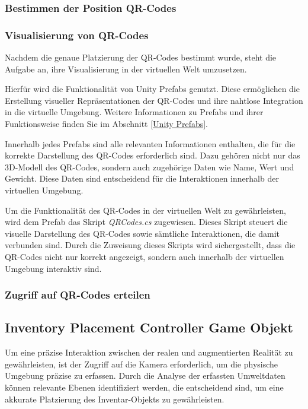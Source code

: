 \subsubsection{Bestimmen der Position QR-Codes}

\subsubsection{Visualisierung von QR-Codes}
Nachdem die genaue Platzierung der QR-Codes bestimmt wurde, steht die Aufgabe an, ihre Visualisierung in der virtuellen Welt umzusetzen.

Hierfür wird die Funktionalität von Unity Prefabs genutzt. Diese ermöglichen die Erstellung visueller Repräsentationen
der QR-Codes und ihre nahtlose Integration in die virtuelle Umgebung. Weitere Informationen zu Prefabs und ihrer Funktionsweise
finden Sie im Abschnitt \ref{Unity Prefabs}.

Innerhalb jedes Prefabs sind alle relevanten Informationen enthalten, die für die korrekte Darstellung des QR-Codes
erforderlich sind. Dazu gehören nicht nur das 3D-Modell des QR-Codes, sondern auch zugehörige Daten wie Name, Wert und
Gewicht. Diese Daten sind entscheidend für die Interaktionen innerhalb der virtuellen Umgebung.

Um die Funktionalität des QR-Codes in der virtuellen Welt zu gewährleisten, wird dem Prefab das Skript \textit{QRCodes.cs} zugewiesen.
Dieses Skript steuert die visuelle Darstellung des QR-Codes sowie sämtliche Interaktionen, die damit verbunden sind. Durch
die Zuweisung dieses Skripts wird sichergestellt, dass die QR-Codes nicht nur korrekt angezeigt, sondern auch innerhalb
der virtuellen Umgebung interaktiv sind.

\subsubsection{Zugriff auf QR-Codes erteilen}

\subsection{Inventory Placement Controller Game Objekt}
Um eine präzise Interaktion zwischen der realen und augmentierten Realität zu gewährleisten, ist der Zugriff auf die
Kamera erforderlich, um die physische Umgebung präzise zu erfassen. Durch die Analyse der erfassten Umweltdaten können
relevante Ebenen identifiziert werden, die entscheidend sind, um eine akkurate Platzierung des Inventar-Objekts zu gewährleisten.

